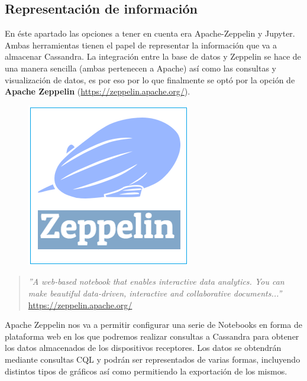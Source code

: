 \subsection{Representación de información}

En éste apartado las opciones a tener en cuenta era Apache-Zeppelin y Jupyter. Ambas herramientas tienen el papel de representar la información que va a almacenar Cassandra. La integración entre la base de datos y Zeppelin se hace de una manera sencilla (ambas pertenecen a Apache) así como las consultas y visualización de datos, es por eso por lo que finalmente se optó por la opción de \textbf{Apache Zeppelin} (\url{https://zeppelin.apache.org/}).

\begin{figure}[!ht]
  \begin{center}
    \includegraphics[scale=0.60]{../images/zeppelin/logo.png}
    \label{fig:zepplog}
	\end{center}
\end{figure}

\begin{quote}\textit{ ''A web-based notebook that enables interactive data analytics.
You can make beautiful data-driven, interactive and collaborative documents...''
}
\newline
\url{https://zeppelin.apache.org/}
\end{quote}

Apache Zeppelin nos va a permitir configurar una serie de Notebooks en forma de plataforma web en los que podremos realizar consultas a Cassandra para obtener los datos almacenados de los dispositivos receptores. Los datos se obtendrán mediante consultas CQL y podrán ser representados de varias formas, incluyendo distintos tipos de gráficos así como permitiendo la exportación de los mismos.

\newpage

